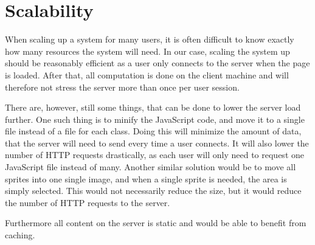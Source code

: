 \section{Scalability}
When scaling up a system for many users, it is often difficult to know exactly how many resources the system will need.
In our case, scaling the system up should be reasonably efficient as a user only connects to the server when the page is loaded.
After that, all computation is done on the client machine and will therefore not stress the server more than once per user session.\newline

There are, however, still some things, that can be done to lower the server load further.
One such thing is to minify the JavaScript code, and move it to a single file instead of a file for each class.
Doing this will minimize the amount of data, that the server will need to send every time a user connects.
It will also lower the number of HTTP requests drastically, as each user will only need to request one JavaScript file instead of many.
Another similar solution would be to move all sprites into one single image, and when a single sprite is needed, the area is simply selected. This would not necessarily reduce the size, but it would reduce the number of HTTP requests to the server.\newline

Furthermore all content on the server is static and would be able to benefit from caching. 
